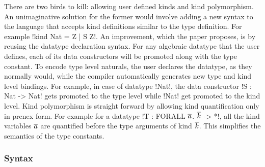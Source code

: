 \documentclass[manuscript,screen,nonacm]{acmart}
\begin{document}
There are two birds to kill: allowing user defined kinds and kind polymorphism. An unimaginative solution for the former would involve adding a new syntax to the language that accepts kind definitions similar to the type definition. For example !kind Nat = Z | S Z!. An improvement, which the paper proposes, is by reusing the datatype declaration syntax. For any algebraic datatype that the user defines, each of its data constructors will be promoted along with the type constant. To encode type level naturals, the user declares the datatype, as they normally would, while the compiler automatically generates new type and kind level bindings. For example, in case of datatype !Nat!, the data constructor !S : Nat -> Nat! gets promoted to the type level while !Nat! get promoted to the kind level. Kind polymorphism is straight forward by allowing kind quantification only in prenex form. For example for a datatype !T : FORALL $\overline{a}$. $\overline{k}$ -> *!, all the kind variables $\overline{a}$ are quantified before the type arguments of kind $\overline{k}$. This simplifies the semantics of the type constants.

\subsubsection{Syntax}
\end{document}

